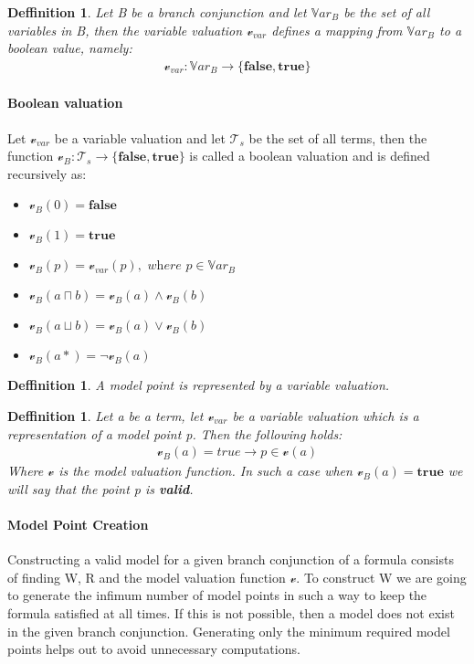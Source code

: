 \documentclass{article}
\newtheorem{defn}[theorem]{Deffinition}
\newcommand{\vVar}{\mathscr{v}_{var}}
\newcommand{\Var}{\mathbb{V}ar}
\newcommand{\vE}{\mathscr{v}}
\newcommand{\vBool}{\mathscr{v}_B}
\newcommand{\Ts}{\mathcal{T}_s}
\begin{document}
	\begin{defn}
		Let B be a branch conjunction and let $\Var_B$ be the set of all variables in B, then the variable valuation $\vVar$ defines a mapping from $\Var_B$ to a boolean value, namely:
		\begin{align*}
			\vVar : \Var_B \rightarrow \{ \textbf{false}, \textbf{true}\}
		\end{align*}
	\end{defn}

	\paragraph{Boolean valuation} 
		Let $\vVar$ be a variable valuation and let $\Ts$ be the set of all terms,
		then the function $\vBool : \Ts \rightarrow \{ \textbf{false}, \textbf{true}\}$ is called a boolean valuation and is defined recursively as:
		\begin{itemize}
			\item $\vBool(0) = \textbf{false}$
			\item $\vBool(1) = \textbf{true}$
			\item $\vBool(p) = \vVar(p), \textit{ where } p \in \Var_B$
			\item $\vBool(a \sqcap b) = \vBool(a) \land \vBool(b)$
			\item $\vBool(a \sqcup b) = \vBool(a) \lor \vBool(b)$
			\item $\vBool(a*) = \neg \vBool(a)$
		\end{itemize}

	\begin{defn} 
		A model point is represented by a variable valuation.
	\end{defn}

	\begin{defn}
		Let a be a term, let $\vVar$ be a variable valuation which is a representation of a model point p. Then the following holds:
		\begin{align*}
			\vBool(a) = true \rightarrow p \in \vE(a)
		\end{align*}
		Where $\vE$ is the model valuation function. In such a case when $\vBool(a) = \textbf{true}$ we will say that the point p is \textbf{valid}.
	\end{defn}
	
	\paragraph{Model Point Creation}
		Constructing a valid model for a given branch conjunction of a formula consists of finding W, R and the model valuation function $\vE$.
		To construct W we are going to generate the infimum number of model points in such a way to keep the formula satisfied at all times.
		If this is not possible, then a model does not exist in the given branch conjunction. Generating only the minimum 
		required model points helps out to avoid unnecessary computations.
\end{document}
